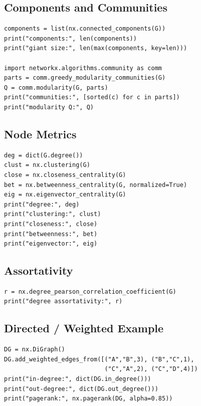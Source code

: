 \subsection*{Components and Communities}
\begin{lstlisting}
components = list(nx.connected_components(G))
print("components:", len(components))
print("giant size:", len(max(components, key=len)))

import networkx.algorithms.community as comm
parts = comm.greedy_modularity_communities(G)
Q = comm.modularity(G, parts)
print("communities:", [sorted(c) for c in parts])
print("modularity Q:", Q)
\end{lstlisting}

\subsection*{Node Metrics}
\begin{lstlisting}
deg = dict(G.degree())
clust = nx.clustering(G)
close = nx.closeness_centrality(G)
bet = nx.betweenness_centrality(G, normalized=True)
eig = nx.eigenvector_centrality(G)
print("degree:", deg)
print("clustering:", clust)
print("closeness:", close)
print("betweenness:", bet)
print("eigenvector:", eig)
\end{lstlisting}

\subsection*{Assortativity}
\begin{lstlisting}
r = nx.degree_pearson_correlation_coefficient(G)
print("degree assortativity:", r)
\end{lstlisting}

\subsection*{Directed / Weighted Example}
\begin{lstlisting}
DG = nx.DiGraph()
DG.add_weighted_edges_from([("A","B",3), ("B","C",1),
                            ("C","A",2), ("C","D",4)])
print("in-degree:", dict(DG.in_degree()))
print("out-degree:", dict(DG.out_degree()))
print("pagerank:", nx.pagerank(DG, alpha=0.85))
\end{lstlisting}

